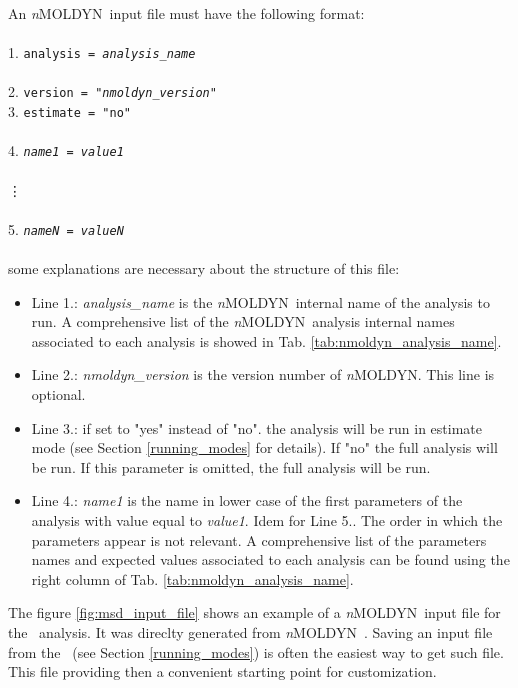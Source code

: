 \documentclass[a4paper,11pt]{report}
\newcommand{\NMOLDYN}{\textit{n}MOLDYN}
\begin{document}
\noindent An \NMOLDYN\ input file must have the following format:
\\\\
1. \texttt{analysis = \textit{analysis\_name}}\\\\
2. \texttt{version = "\textit{nmoldyn\_version}"}\\
3. \texttt{estimate = "no"}\\\\
4. \texttt{\textit{name1} = \textit{value1}}
\\\\
\vdots
\\\\
5. \texttt{\textit{nameN} = \textit{valueN}}
\\\\
\noindent some explanations are necessary about the structure of this file:
\begin{itemize}
\item Line 1.: \textit{analysis\_name} is the \NMOLDYN\ internal name of the analysis to run. A comprehensive list of the 
\NMOLDYN\ analysis internal names associated to each analysis is showed in Tab. \ref{tab:nmoldyn_analysis_name}.
\item Line 2.: \textit{nmoldyn\_version} is the version number of \NMOLDYN . This line is optional.
\item Line 3.: if set to "yes" instead of "no". the analysis will be run in estimate mode (see Section \ref{running_modes} 
for details). If "no" the full analysis will be run. If this parameter is omitted, the full analysis will be run.
\item Line 4.: \textit{name1} is the name in lower case of the first parameters of the analysis with value equal to \textit{value1}. 
Idem for Line 5.. The order in which the parameters appear is not relevant. A comprehensive list of the parameters names and 
expected values associated to each analysis can be found using the right column of Tab. \ref{tab:nmoldyn_analysis_name}.
\end{itemize}
\newpage
The figure \ref{fig:msd_input_file} shows an example of a \NMOLDYN\ input file for the \MSD\ analysis. It was direclty 
generated from \NMOLDYN\ \GUI . Saving an input file from the \GUI\ (see Section \ref{running_modes}) is often the 
easiest way to get such file. This file providing then  a convenient starting point for customization. 
\end{document}
